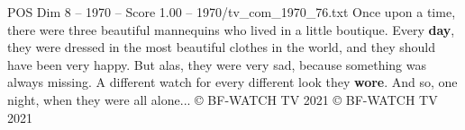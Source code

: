 \begin{textsample}{POS Dim 8 – 1970 – Score 1.00 – 1970/tv\_com\_1970\_76.txt}  \label{ex:f8_pos_085}
Once upon a time, there were three beautiful mannequins who lived in a little boutique.
Every \textbf{day}, they were dressed in the most beautiful clothes in the world, and they should have been very happy.
But alas, they were very sad, because something was always missing.
A different watch for every different look they \textbf{wore}.
And so, one night, when they were all alone... {\EmojiFont ©} BF-WATCH TV 2021 {\EmojiFont ©} BF-WATCH TV 2021

\end{textsample}
